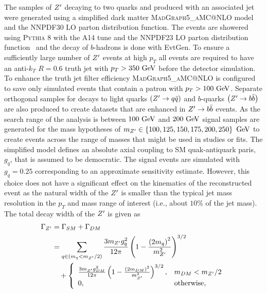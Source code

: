 The samples of $Z'$ decaying to two quarks and produced with an associated jet were generated using a simplified dark matter \textsc{MadGraph5_aMC@NLO} model~\cite{Abercrombie:2015wmb} and the NNPDF30 LO parton distribution function.
The events are showered using \textsc{Pythia 8} with the A14 tune and the NNPDF23 LO parton distribution function~\cite{Carrazza:2013axa} and the decay of $b$-hadrons is done with EvtGen.
To ensure a sufficiently large number of $Z'$ events at high $p_{T}$ all events are required to have an anti-$k_{T}$ $R = 0.6$ truth jet with $p_{T} > 350~\mathrm{GeV}$ before the detector simulation.
To enhance the truth jet filter efficiency \textsc{MadGraph5_aMC@NLO} is configured to save only simulated events that contain a patron with $p_{T} > 100~\mathrm{GeV}$.
Separate orthogonal samples for decays to light quarks $\left(Z' \to q\bar{q}\right)$ and $b$-quarks $\left(Z' \to b\bar{b}\right)$ are also produced to create datasets that are enhanced in $Z' \to b\bar{b}$ events.
As the search range of the analysis is between $100~\mathrm{GeV}$ and $200~\mathrm{GeV}$ signal samples are generated for the mass hypotheses of $m_{Z'} \in \left\{100, 125, 150, 175, 200, 250\right\}~\mathrm{GeV}$ to create events across the range of masses that might be used in studies or fits.
The simplified model defines an absolute axial coupling to SM quak-antiquark paris, $g_{q}$, that is assumed to be democratic.
The signal events are simulated with $g_{q} = 0.25$ corresponding to an approximate sensitivity estimate.
However, this choice does not have a significant effect on the kinematics of the reconstructed event as the natural width of the $Z'$ is smaller than the typical \largeR{} jet mass resolution in the $p_{T}$ and mass range of interest (i.e., about $10\%$ of the jet mass).
The total decay width of the $Z'$ is given as
\[
 \begin{split}
  \Gamma_{Z'} &= \Gamma_{SM} + \Gamma_{DM} \\
  &= \sum_{q \in \left(m_{q} < m_{Z'}/2\right)} \frac{3 m_{Z'} g_{q}^{2}}{12 \pi} \left(1 - \frac{\left(2m_{q}\right)^{2}}{m_{Z'}^{2}}\right)^{3/2} \\
  &\quad + \left\{\begin{array}{ll}
   \frac{3 m_{Z'} g_{DM}^{2}}{12 \pi} \left(1 - \frac{\left(2m_{DM}\right)^{2}}{m_{Z'}^{2}}\right)^{3/2}, & m_{DM} < m_{Z'}/2 \\
   0,                                                                                                               & \mathrm{otherwise},
  \end{array}\right.
 \end{split}
\]
